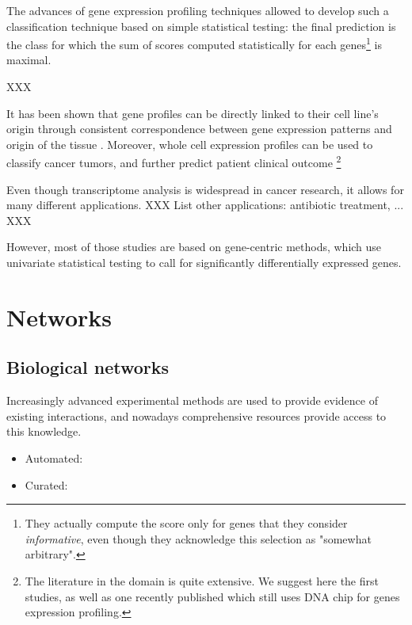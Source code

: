 	The advances of gene expression profiling techniques allowed \textcite{golub1999molecular} to develop such a classification technique based on simple statistical testing: the final prediction is the class for which the sum of scores computed statistically for each genes\footnote{They actually compute the score only for genes that they consider \emph{informative}, even though they acknowledge this selection as "somewhat arbitrary".} is maximal.

	XXX

	It has been shown that gene profiles can be directly linked to their cell line's origin through consistent correspondence between gene expression patterns and origin of the tissue \parencite{ross2000systematic}.
	Moreover, whole cell expression profiles can be used to classify cancer tumors, and further predict patient clinical outcome \parencites{perou2000molecular}{sorlie2001gene}{vantveer2002gene}{vijver2002gene}{estevez2015gene}\footnote{The literature in the domain is quite extensive. We suggest here the first studies, as well as one recently published which still uses DNA chip for genes expression profiling.}

	Even though transcriptome analysis is widespread in cancer research, it allows for many different applications. XXX List other applications: antibiotic treatment, ... XXX

	However, most of those studies are based on gene-centric methods, which use univariate statistical testing to call for significantly differentially expressed genes.

\section{Networks}

\subsection{Biological networks}

	Increasingly advanced experimental methods are used to provide evidence of existing interactions, and nowadays comprehensive resources provide access to this knowledge.

	\begin{itemize}
		\item Automated: \parencite{szklarczyk2014string}
		\item Curated: \parencite{orchard2012protein}
	\end{itemize}

